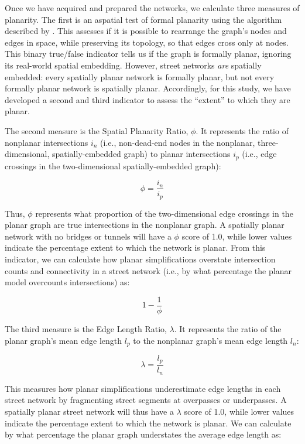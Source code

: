 \documentclass[Afour,sageh,times]{sagej}
\begin{document}
Once we have acquired and prepared the networks, we calculate three measures of planarity. The first is an aspatial test of formal planarity using the algorithm described by \citet{boyer_subgraph_2012}. This assesses if it is possible to rearrange the graph's nodes and edges in space, while preserving its topology, so that edges cross only at nodes. This binary true/false indicator tells us if the graph is formally planar, ignoring its real-world spatial embedding. However, street networks \emph{are} spatially embedded: every spatially planar network is formally planar, but not every formally planar network is spatially planar. Accordingly, for this study, we have developed a second and third indicator to assess the \enquote{extent} to which they are planar.

The second measure is the Spatial Planarity Ratio, $\phi$. It represents the ratio of nonplanar intersections $i_n$ (i.e., non-dead-end nodes in the nonplanar, three-dimensional, spatially-embedded graph) to planar intersections $i_p$ (i.e., edge crossings in the two-dimensional spatially-embedded graph): 

\begin{equation}
	\label{eq:spr}
	\phi = \frac{i_n}{i_p}
\end{equation}

Thus, $\phi$ represents what proportion of the two-dimensional edge crossings in the planar graph are true intersections in the nonplanar graph. A spatially planar network with no bridges or tunnels will have a $\phi$ score of 1.0, while lower values indicate the percentage extent to which the network is planar. From this indicator, we can calculate how planar simplifications overstate intersection counts and connectivity in a street network (i.e., by what percentage the planar model overcounts intersections) as:

\begin{equation}
	\label{eq:spr_overstates}
	1 - \frac{1}{\phi}
\end{equation}

The third measure is the Edge Length Ratio, $\lambda$. It represents the ratio of the planar graph's mean edge length $l_p$ to the nonplanar graph's mean edge length $l_n$:

\begin{equation}
	\label{eq:elr}
	\lambda = \frac{l_p}{l_n}
\end{equation}

This measures how planar simplifications underestimate edge lengths in each street network by fragmenting street segments at overpasses or underpasses. A spatially planar street network will thus have a $\lambda$ score of 1.0, while lower values indicate the percentage extent to which the network is planar. We can calculate by what percentage the planar graph understates the average edge length as:
\end{document}
